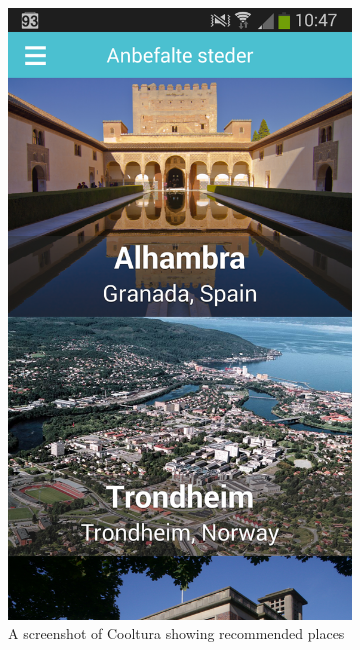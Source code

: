  
\begin{figure}
\centering
	\begin{subfigure}[h]{0.4\textwidth}
		\includegraphics[width=\textwidth]{fig/cooltura_screenshot1}
		\caption{A screenshot of Cooltura showing recommended places}
		\label{Fig:cooltura_screenshot1}
	\end{subfigure}
	\begin{subfigure}[h]{0.4\textwidth}

\end{subfigure}
\end{figure}

